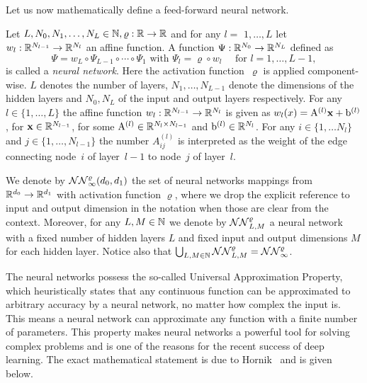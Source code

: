 Let us now mathematically define a feed-forward neural network.

\begin{definition}\label{def:neuralnet}
Let $L, N_{0}, N_{1}, \ldots, N_{L} \in \mathbb{N}, \varrho: \mathbb{R} \rightarrow \mathbb{R}$ and for any $l=$
$1, \ldots, L$ let $w_{l}: \mathbb{R}^{N_{l-1}} \rightarrow \mathbb{R}^{N_{l}}$ an affine function. A function $\Psi: \mathbb{R}^{N_{0}} \rightarrow \mathbb{R}^{N_{L}}$
defined as
\[
\Psi=w_{L} \circ \Psi_{L-1} \circ \cdots \circ \Psi_{1} \text { with } \Psi_{l}=\varrho \circ w_{l} \quad \text { for } l=1, \ldots, L-1,
\]
is called a \textit{neural network}. Here the activation function~$\varrho$ is
applied component-wise. $L$ denotes the number of layers, $N_{1}, \ldots, N_{L-1}$ denote
the dimensions of the hidden layers and $N_{0}, N_{L}$ of the input and output layers respectively. 
For any $l\in\{1, \dots, L\}$ the affine function $w_{l}:\mathbb{R}^{N_{l-1}}\to\mathbb{R}^{N_{l}}$ is given as $w_{l}(x) = \mathrm{A}^{(l)} \boldsymbol{\mathrm{x}} + \mathrm{b}^{(l)}$,
for $\boldsymbol{\mathrm{x}}\in \mathbb{R}^{N_{l-1}}$, for some $\mathrm{A}^{(l)} \in \mathbb{R}^{N_{l}\times N_{l-1}} $ and $\mathrm{b}^{(l)} \in \mathbb{R}^{N_{l}}$.
For any $i\in\{1, \dots N_{l}\}$ and $j\in\{1, \dots, N_{l-1}\}$ the number $A_{i j}^{(l)}$ is interpreted as the weight of the edge connecting node~$i$ of layer~$l-1$ to node~$j$ of layer~$l$.
\end{definition}

We denote by $\mathcal{NN}_{\infty}^{\varrho}(d_0,d_1)$ the set of neural networks mappings from $\mathbb{R}^{d_0} \rightarrow \mathbb{R}^{d_1}$ with activation function $\varrho$, where we drop the explicit reference to input and output dimension in the notation when those are clear from the context. %
Moreover, for any $L, M \in \mathbb{N}$ we denote by $\mathcal{NN}_{L, M}^\varrho$ a neural network with a fixed number of hidden layers $L$ and fixed input and output dimensions $M$ for each hidden layer. %
Notice also that $\bigcup_{L,M\in\mathbb{N}}\mathcal{NN}_{L,M}^\varrho = \mathcal{NN}_{\infty}^\varrho$.

The neural networks possess the so-called Universal Approximation Property, which heuristically states that any continuous function can be approximated to arbitrary accuracy by a neural network, no matter how complex the input is. This means a neural network can approximate any function with a finite number of parameters. This property makes neural networks a powerful tool for solving complex problems and is one of the reasons for the recent success of deep learning. The exact mathematical statement is due to Hornik~\cite{Hornik1991ApproximationNetworks} and is given below.

